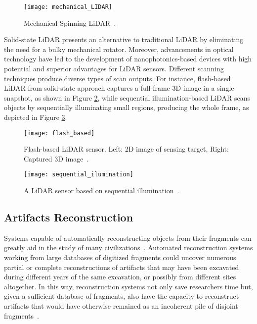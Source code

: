  
\begin{figure}[h!]
    \centering
    \texttt{[image: mechanical\_LIDAR]}
    \caption{Mechanical Spinning \gls{LiDAR}~\cite{inbook}.}
    \label{fig:mechanical_LIDAR}
\end{figure} 
\FloatBarrier


Solid-state \gls{LiDAR} presents an alternative to traditional \gls{LiDAR} by eliminating the need for a bulky mechanical rotator. %
Moreover, advancements in optical technology have led to the development of nanophotonics-based devices with high potential and superior advantages for \gls{LiDAR} sensors. %
Different scanning techniques produce diverse types of scan outputs. For instance, flash-based LiDAR from solid-state approach captures a full-frame \gls{3D} image in a single snapshot, as shown in Figure \ref{fig:flash_based}, while sequential illumination-based LiDAR scans objects by sequentially illuminating small regions, producing the whole frame, as depicted in Figure \ref{fig:sequential_ilumination}.

\begin{figure}[h!]
    \centering
    \texttt{[image: flash\_based]}
    \caption{Flash-based \gls{LiDAR} sensor. \small{Left: \gls{2D} image of sensing target, Right: Captured \gls{3D} image}~\cite{li2022progress}.}
    \label{fig:flash_based}
\end{figure} 



\begin{figure}[h!]
    \centering
    \texttt{[image: sequential\_ilumination]}
    \caption{A \gls{LiDAR} sensor based on sequential illumination~\cite{li2022progress}.}
    \label{fig:sequential_ilumination}
\end{figure} 

\FloatBarrier

\subsection{Artifacts Reconstruction}
\label{sec:reconstruction}

Systems capable of automatically reconstructing objects from their fragments can greatly aid in the study of many civilizations~\cite{willis2008computational}.
Automated reconstruction systems working from large databases of digitized fragments could uncover numerous partial or
complete reconstructions of artifacts that may have been excavated during different years of the same excavation, or possibly
from different sites altogether. In this way, reconstruction systems not only save researchers time but, given a sufficient database 
of fragments, also have the capacity to reconstruct artifacts that would have otherwise remained as an incoherent pile of disjoint fragments~.

